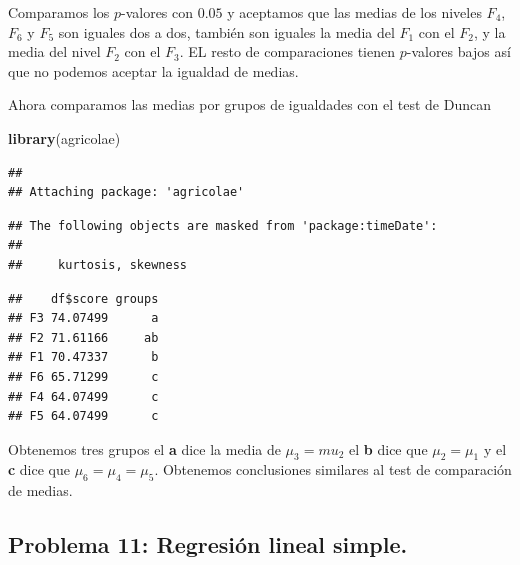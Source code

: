 \documentclass[
]{article}
\newenvironment{Shaded}{\begin{snugshade}}{\end{snugshade}}
\newcommand{\DataTypeTok}[1]{\textcolor[rgb]{0.13,0.29,0.53}{#1}}
\newcommand{\KeywordTok}[1]{\textcolor[rgb]{0.13,0.29,0.53}{\textbf{#1}}}
\newcommand{\NormalTok}[1]{#1}
\newcommand{\OperatorTok}[1]{\textcolor[rgb]{0.81,0.36,0.00}{\textbf{#1}}}
\newcommand{\OtherTok}[1]{\textcolor[rgb]{0.56,0.35,0.01}{#1}}
\newcommand{\StringTok}[1]{\textcolor[rgb]{0.31,0.60,0.02}{#1}}
\begin{document}
Comparamos los \(p\)-valores con \(0.05\) y aceptamos que las medias de
los niveles \(F_4\), \(F_6\) y \(F_5\) son iguales dos a dos, también
son iguales la media del \(F_1\) con el \(F_2\), y la media del nivel
\(F_2\) con el \(F_3\). EL resto de comparaciones tienen \(p\)-valores
bajos así que no podemos aceptar la igualdad de medias.

Ahora comparamos las medias por grupos de igualdades con el test de
Duncan

\begin{Shaded}
\begin{Highlighting}[]
\KeywordTok{library}\NormalTok{(agricolae)}
\end{Highlighting}
\end{Shaded}

\begin{verbatim}
## 
## Attaching package: 'agricolae'
\end{verbatim}

\begin{verbatim}
## The following objects are masked from 'package:timeDate':
## 
##     kurtosis, skewness
\end{verbatim}

\begin{Shaded}
\end{Shaded}

\begin{verbatim}
##    df$score groups
## F3 74.07499      a
## F2 71.61166     ab
## F1 70.47337      b
## F6 65.71299      c
## F4 64.07499      c
## F5 64.07499      c
\end{verbatim}

Obtenemos tres grupos el \textbf{a} dice la media de \(\mu_3=mu_2\) el
\textbf{b} dice que \(\mu_2=\mu_1\) y el \textbf{c} dice que
\(\mu_6=\mu_4=\mu_5\). Obtenemos conclusiones similares al test de
comparación de medias.

\hypertarget{problema-11-regresiuxf3n-lineal-simple.}{%
\subsection{Problema 11: Regresión lineal
simple.}\label{problema-11-regresiuxf3n-lineal-simple.}}
\end{document}
